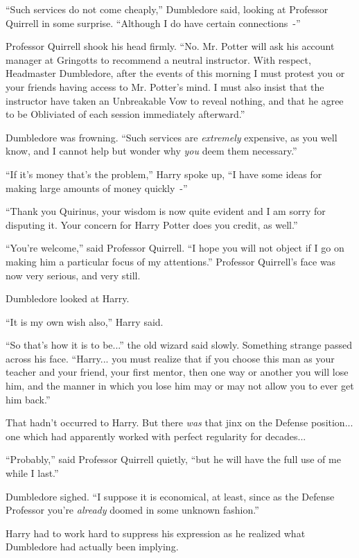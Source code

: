 ``Such services do not come cheaply,'' Dumbledore said, looking at Professor Quirrell in some surprise. ``Although I do have certain connections~-''

Professor Quirrell shook his head firmly. ``No. Mr. Potter will ask his account manager at Gringotts to recommend a neutral instructor. With respect, Headmaster Dumbledore, after the events of this morning I must protest you or your friends having access to Mr. Potter's mind. I must also insist that the instructor have taken an Unbreakable Vow to reveal nothing, and that he agree to be Obliviated of each session immediately afterward.''

Dumbledore was frowning. ``Such services are \emph{extremely} expensive, as you well know, and I cannot help but wonder why \emph{you} deem them necessary.''

``If it's money that's the problem,'' Harry spoke up, ``I have some ideas for making large amounts of money quickly~-''

``Thank you Quirinus, your wisdom is now quite evident and I am sorry for disputing it. Your concern for Harry Potter does you credit, as well.''

``You're welcome,'' said Professor Quirrell. ``I hope you will not object if I go on making him a particular focus of my attentions.'' Professor Quirrell's face was now very serious, and very still.

Dumbledore looked at Harry.

``It is my own wish also,'' Harry said.

``So that's how it is to be...'' the old wizard said slowly. Something strange passed across his face. ``Harry... you must realize that if you choose this man as your teacher and your friend, your first mentor, then one way or another you will lose him, and the manner in which you lose him may or may not allow you to ever get him back.''

That hadn't occurred to Harry. But there \emph{was} that jinx on the Defense position... one which had apparently worked with perfect regularity for decades...

``Probably,'' said Professor Quirrell quietly, ``but he will have the full use of me while I last.''

Dumbledore sighed. ``I suppose it is economical, at least, since as the Defense Professor you're \emph{already} doomed in some unknown fashion.''

Harry had to work hard to suppress his expression as he realized what Dumbledore had actually been implying.

